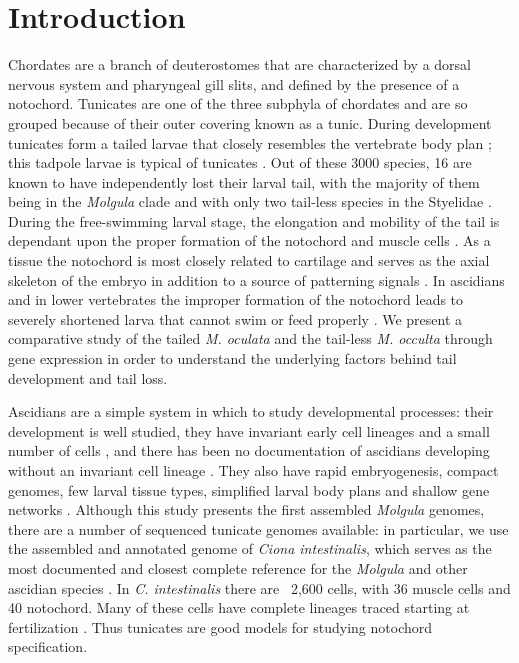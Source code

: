 \chapter{Introduction}
Chordates are a branch of deuterostomes that are characterized by a dorsal nervous system and pharyngeal gill slits, and defined by the presence of a notochord. Tunicates are one of the three subphyla of chordates and are so grouped because of their outer covering known as a tunic. During development tunicates form a tailed larvae that closely resembles the vertebrate body plan \cite{jeffery_minireview_2002}; this tadpole larvae is typical of  tunicates \cite{huber_evolution_2000}. Out of these 3000 species, 16 are known to have independently lost their larval tail, with the majority of them being in the \textit{Molgula} clade \cite{berrill_studies_1931,swalla_interspecific_1990} and with only two tail-less species in the Styelidae \cite{huber_evolution_2000}. During the free-swimming larval stage, the elongation and mobility of the tail is dependant upon the proper formation of the notochord and muscle cells \cite{satoh_ascidian_2003}. As a tissue the notochord is most closely related to cartilage and serves as the axial skeleton of the embryo in addition to a source of patterning signals \cite{jeffery_evolution_1999}. In ascidians and in lower vertebrates the improper formation of the notochord leads to severely shortened larva that cannot swim or feed properly \cite{di_gregorio_tail_2002,jiang_ascidian_2005,stemple_structure_2005}.
We present a comparative study of the tailed \textit{M. oculata} and the tail-less \textit{M. occulta} through gene expression in order to understand the underlying factors behind tail development and tail loss.

Ascidians are a simple system in which to study developmental processes: their development is well studied, they have invariant early cell lineages and a small number of cells \cite{lemaire_evolutionary_2011}, and there has been no documentation of ascidians developing without an invariant cell lineage \cite{lemaire_ascidians_2008}. They also have rapid embryogenesis, compact genomes, few larval tissue types, simplified larval body plans and shallow gene networks \cite{corbo_characterization_1997,jeffery_minireview_2002,dehal_draft_2002}. Although this study presents the first assembled \textit{Molgula} genomes, there are a number of sequenced tunicate genomes available: in particular, we use the assembled and annotated genome of \textit{Ciona intestinalis}, which serves as the most documented and closest complete reference for the \textit{Molgula} and other ascidian species \cite{dehal_draft_2002,satoh_ascidian_2003,satoh_ciona_2003}. In \textit{C. intestinalis} there are ~2,600 cells, with 36 muscle cells and 40 notochord.  Many of these cells have complete lineages traced starting at fertilization \cite{nishida_cell_1983}. Thus tunicates are good models for studying notochord specification.

